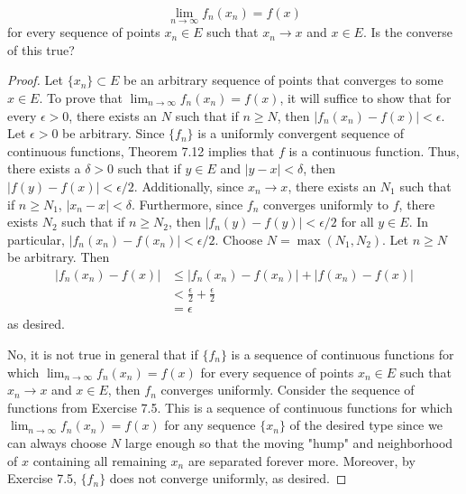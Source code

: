 \documentclass[../psets.tex]{subfiles}
\begin{document}
\begin{enumerate}[label={\textbf{\arabic*.}}]
    \begin{equation*}
        \lim_{n\to\infty}f_n(x_n) = f(x)
    \end{equation*}
    for every sequence of points $x_n\in E$ such that $x_n\to x$ and $x\in E$. Is the converse of this true?
    \begin{proof}
        Let $\{x_n\}\subset E$ be an arbitrary sequence of points that converges to some $x\in E$. To prove that $\lim_{n\to\infty}f_n(x_n)=f(x)$, it will suffice to show that for every $\epsilon>0$, there exists an $N$ such that if $n\geq N$, then $|f_n(x_n)-f(x)|<\epsilon$. Let $\epsilon>0$ be arbitrary. Since $\{f_n\}$ is a uniformly convergent sequence of continuous functions, Theorem 7.12 implies that $f$ is a continuous function. Thus, there exists a $\delta>0$ such that if $y\in E$ and $|y-x|<\delta$, then $|f(y)-f(x)|<\epsilon/2$. Additionally, since $x_n\to x$, there exists an $N_1$ such that if $n\geq N_1$, $|x_n-x|<\delta$. Furthermore, since $f_n$ converges uniformly to $f$, there exists $N_2$ such that if $n\geq N_2$, then $|f_n(y)-f(y)|<\epsilon/2$ for all $y\in E$. In particular, $|f_n(x_n)-f(x_n)|<\epsilon/2$. Choose $N=\max(N_1,N_2)$. Let $n\geq N$ be arbitrary. Then
        \begin{align*}
            |f_n(x_n)-f(x)| &\leq |f_n(x_n)-f(x_n)|+|f(x_n)-f(x)|\\
            &< \frac{\epsilon}{2}+\frac{\epsilon}{2}\\
            &= \epsilon
        \end{align*}
        as desired.\par
        No, it is not true in general that if $\{f_n\}$ is a sequence of continuous functions for which $\lim_{n\to\infty}f_n(x_n)=f(x)$ for every sequence of points $x_n\in E$ such that $x_n\to x$ and $x\in E$, then $f_n$ converges uniformly. Consider the sequence of functions from Exercise 7.5. This is a sequence of continuous functions for which $\lim_{n\to\infty}f_n(x_n)=f(x)$ for any sequence $\{x_n\}$ of the desired type since we can always choose $N$ large enough so that the moving "hump" and neighborhood of $x$ containing all remaining $x_n$ are separated forever more. Moreover, by Exercise 7.5, $\{f_n\}$ does not converge uniformly, as desired.
    \end{proof}
\end{enumerate}
\end{document}

